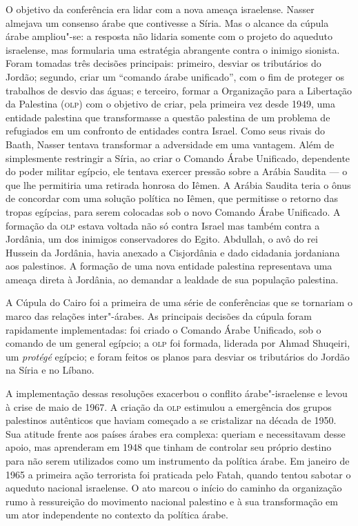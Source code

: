 O objetivo da conferência era lidar com a nova ameaça israelense. Nasser
almejava um consenso árabe que contivesse a Síria. Mas o alcance da
cúpula árabe ampliou"-se: a resposta não lidaria somente com o
projeto do aqueduto israelense, mas formularia uma estratégia abrangente
contra o inimigo sionista. Foram tomadas três decisões principais:
primeiro, desviar os tributários do Jordão; segundo, criar um ``comando
árabe unificado'', com o fim de proteger os trabalhos de desvio das
águas; e terceiro, formar a Organização para a Libertação da Palestina
(\textsc{olp}) com o objetivo de criar, pela primeira vez desde 1949, uma
entidade palestina que transformasse a questão palestina de um problema
de refugiados em um confronto de entidades contra Israel. Como seus
rivais do Baath, Nasser tentava transformar a adversidade em uma
vantagem. Além de simplesmente restringir a Síria, ao criar o Comando
Árabe Unificado, dependente do poder militar egípcio, ele tentava
exercer pressão sobre a Arábia Saudita --- o que lhe permitiria uma
retirada honrosa do Iêmen. A Arábia Saudita teria o ônus de concordar
com uma solução política no Iêmen, que permitisse o retorno das tropas
egípcias, para serem colocadas sob o novo Comando Árabe Unificado. A
formação da \textsc{olp} estava voltada não só contra Israel mas também contra a
Jordânia, um dos inimigos conservadores do Egito. Abdullah, o avô do rei
Hussein da Jordânia, havia anexado a Cisjordânia e dado cidadania
jordaniana aos palestinos. A formação de uma nova entidade palestina
representava uma ameaça direta à Jordânia, ao demandar a lealdade de sua
população palestina.

A Cúpula do Cairo foi a primeira de uma série de conferências que se
tornariam o marco das relações inter"-árabes. As principais decisões da
cúpula foram rapidamente implementadas: foi criado o Comando Árabe
Unificado, sob o comando de um general egípcio; a \textsc{olp} foi formada,
liderada por Ahmad Shuqeiri, um \textit{protégé} egípcio; e foram feitos
os planos para desviar os tributários do Jordão na Síria e no Líbano.

A implementação dessas resoluções exacerbou o conflito árabe"-israelense
e levou à crise de maio de 1967. A criação da \textsc{olp} estimulou a emergência
dos grupos palestinos autênticos que haviam começado a se cristalizar na
década de 1950. Sua atitude frente aos países árabes era complexa:
queriam e necessitavam desse apoio, mas aprenderam em 1948 que tinham de
controlar seu próprio destino para não serem utilizados como um
instrumento da política árabe. Em janeiro de 1965 a primeira ação
terrorista foi praticada pelo Fatah, quando tentou sabotar o aqueduto
nacional israelense. O ato marcou o início do caminho da organização
rumo à ressureição do movimento nacional palestino e à sua transformação
em um ator independente no contexto da política árabe.

